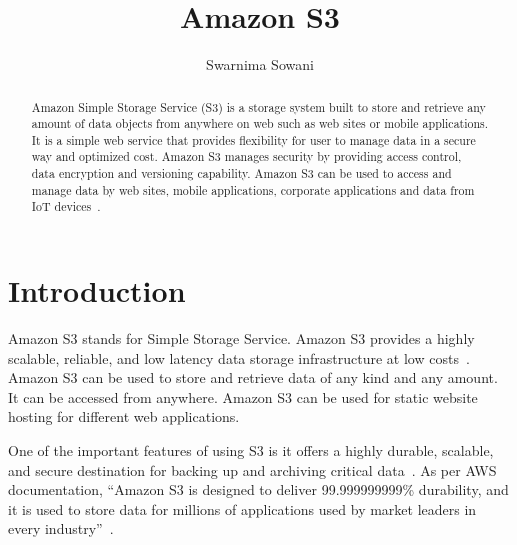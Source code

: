 
\title{Amazon S3}


\author{Swarnima Sowani}

\newcommand{\GE}{\footnote{Grammar}}
\newcommand{\GVL}[1]{\footnote{#1}}
\renewcommand{\shortauthors}{G. v. Laszewski}

\begin{abstract}

Amazon Simple Storage Service (S3) is a storage system built to store and
retrieve any amount of data objects from anywhere on web such as web sites or mobile
applications. It is a simple web service that provides flexibility for user to
manage data in a secure way and optimized cost. Amazon S3 manages security by
providing access control, data encryption and versioning capability. Amazon S3
can be used to access and manage data by web sites, mobile applications,
corporate applications and data from IoT devices~\cite{hid-sp18-420-amazon-S3}.

\end{abstract}


\maketitle

\section{Introduction}

Amazon S3 stands for Simple Storage Service. Amazon S3 provides a highly
scalable, reliable, and low latency data storage infrastructure at low
costs~\cite{hid-sp18-420-amazon-S3-FAQ}. Amazon S3 can be used to store and
retrieve data of any kind and any amount. It can be accessed from anywhere.
Amazon S3 can be used for static website hosting for different web applications.

One of the important features of using S3 is it offers a highly durable,
scalable, and secure destination for backing up and archiving critical
data~\cite{hid-sp18-420-amazon-S3}. As per AWS documentation, ``Amazon S3 is
designed to deliver 99.999999999\% durability, and it is used to store data for
millions of applications used by market leaders in every
industry''~\cite{hid-sp18-420-amazon-S3}.

